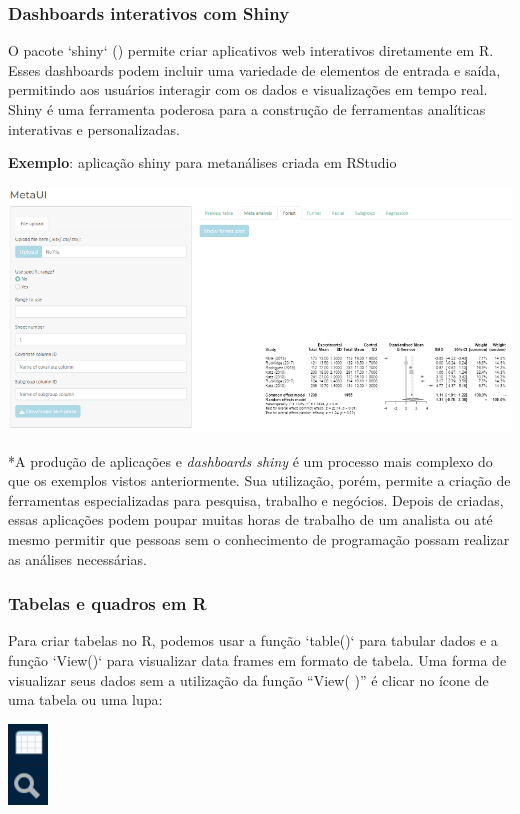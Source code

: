 \documentclass[
]{book}
\begin{document}
\subsubsection{Dashboards interativos com Shiny}\label{dashboards-interativos-com-shiny}

O pacote `shiny` () permite criar aplicativos web interativos diretamente em R. Esses dashboards podem incluir uma variedade de elementos de entrada e saída, permitindo aos usuários interagir com os dados e visualizações em tempo real. Shiny é uma ferramenta poderosa para a construção de ferramentas analíticas interativas e personalizadas.

\textbf{Exemplo}: aplicação shiny para metanálises criada em RStudio

\includegraphics{images/clipboard-3316300773.png}

*A produção de aplicações e \emph{dashboards shiny} é um processo mais complexo do que os exemplos vistos anteriormente. Sua utilização, porém, permite a criação de ferramentas especializadas para pesquisa, trabalho e negócios. Depois de criadas, essas aplicações podem poupar muitas horas de trabalho de um analista ou até mesmo permitir que pessoas sem o conhecimento de programação possam realizar as análises necessárias.

\subsubsection{Tabelas e quadros em R}\label{tabelas-e-quadros-em-r}

Para criar tabelas no R, podemos usar a função `table()` para tabular dados e a função `View()` para visualizar data frames em formato de tabela. Uma forma de visualizar seus dados sem a utilização da função ``View( )'' é clicar no ícone de uma tabela ou uma lupa:

\includegraphics{images/clipboard-4018646742.png}
\end{document}
